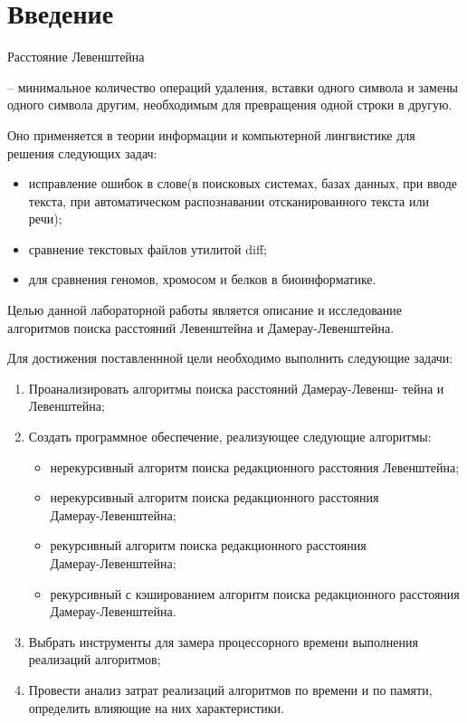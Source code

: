 \chapter*{Введение} 

\begin{bfseries}Расстояние Левенштейна\end{bfseries} -- минимальное количество операций удаления, вставки одного символа и замены 
одного символа другим, необходимым для превращения одной строки в другую.

Оно применяется в теории информации и компьютерной лингвистике для решения следующих задач:

\begin{itemize}[label=---] %
    \item исправление ошибок в слове(в поисковых системах, базах данных, при вводе текста, при автоматическом распознавании отсканированного текста или речи);
	\item сравнение текстовых файлов утилитой diff;
	\item для сравнения геномов, хромосом и белков в биоинформатике.
\end{itemize}

Целью данной лабораторной работы является описание и исследование 
алгоритмов поиска расстояний Левенштейна и Дамерау-Левенштейна.

Для достижения поставленнной цели необходимо выполнить следующие задачи:
\begin{enumerate}[label={\arabic*)}] 
	\item Проанализировать алгоритмы поиска расстояний Дамерау-Левенш-
	тейна и Левенштейна;
	\item Создать программное обеспечение, реализующее следующие алгоритмы:
	\begin{itemize}[label=---]
		\item нерекурсивный алгоритм поиска редакционного расстояния Левенштейна;
		\item нерекурсивный алгоритм поиска редакционного расстояния \\
		Дамерау-Левенштейна;
		\item рекурсивный алгоритм поиска редакционного расстояния \\
		Дамерау-Левенштейна;
		\item рекурсивный с кэшированием алгоритм поиска редакционного расстояния
		Дамерау-Левенштейна.
	\end{itemize}
	\item Выбрать инструменты для замера процессорного времени выполнения реализаций алгоритмов;
	\item Провести анализ затрат реализаций алгоритмов по времени и по памяти, определить влияющие на них характеристики.
\end{enumerate}
